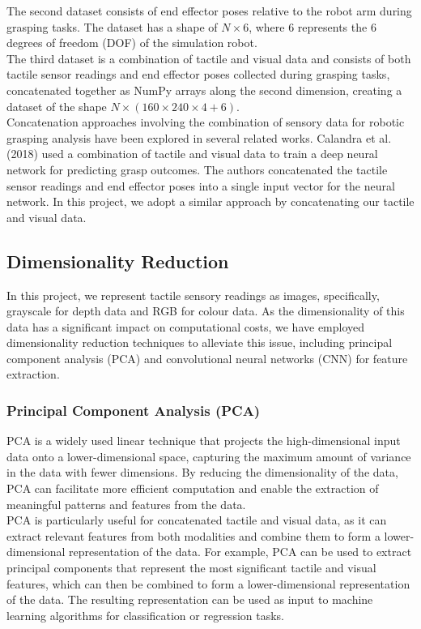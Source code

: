 \documentclass[11pt, a4paper]{report}
\begin{document}
The second dataset consists of end effector poses relative to the robot arm during grasping tasks. The dataset has a shape of $N\times6$, where $6$ represents the 6 degrees of freedom (DOF) of the simulation robot.\\

The third dataset is a combination of tactile and visual data and consists of both tactile sensor readings and end effector poses collected during grasping tasks, concatenated together as NumPy arrays along the second dimension, creating a dataset of the shape $N\times(160\times240\times4+6)$.\\

Concatenation approaches involving the combination of sensory data for robotic grasping analysis have been explored in several related works. Calandra et al. (2018) \cite{Calandra_2018} used a combination of tactile and visual data to train a deep neural network for predicting grasp outcomes. The authors concatenated the tactile sensor readings and end effector poses into a single input vector for the neural network. In this project, we adopt a similar approach by concatenating our tactile and visual data.


\subsection{Dimensionality Reduction}\label{sec:4.4.2}
In this project, we represent tactile sensory readings as images, specifically, grayscale for depth data and RGB for colour data. As the dimensionality of this data has a significant impact on computational costs, we have employed dimensionality reduction techniques to alleviate this issue, including principal component analysis (PCA) and convolutional neural networks (CNN) for feature extraction.


\subsubsection{Principal Component Analysis (PCA)}\label{sec:4.4.2.1}
PCA is a widely used linear technique that projects the high-dimensional input data onto a lower-dimensional space, capturing the maximum amount of variance in the data with fewer dimensions. By reducing the dimensionality of the data, PCA can facilitate more efficient computation and enable the extraction of meaningful patterns and features from the data.\\

PCA is particularly useful for concatenated tactile and visual data, as it can extract relevant features from both modalities and combine them to form a lower-dimensional representation of the data. For example, PCA can be used to extract principal components that represent the most significant tactile and visual features, which can then be combined to form a lower-dimensional representation of the data. The resulting representation can be used as input to machine learning algorithms for classification or regression tasks.\\
\end{document}
